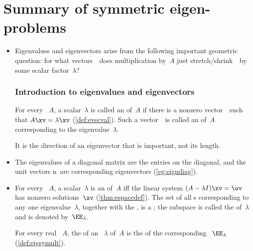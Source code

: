 

\section{Summary of symmetric eigen-problems}
\label{sec:sumevs}


\begin{itemize}
\def\index#1{}%

\item Eigenvalues and eigenvectors arise from the following important geometric question: for what vectors~\vv\ does multiplication by~\(A\) just stretch\slash shrink~\vv\ by some scalar factor~\(\lambda\)?

\subsubsection{Introduction to eigenvalues and eigenvectors}

\itemhi For every ~\(A\),  
a scalar~\(\lambda\) is called an  of~\(A\) if 
there is a nonzero vector~\xv\ such that \(A\xv=\lambda\xv\) (\autoref{def:evecval}). 
Such a vector~\xv\ is called an  of~\(A\) corresponding to the eigenvalue~\(\lambda\).   

It is the direction of an eigenvector that is important, not its length.

\item The eigenvalues of a diagonal matrix are the entries on the diagonal, and the unit vectors \hlist\ev n\ are corresponding eigenvectors (\autoref{eg:eigndiag}). 

\item For every ~\(A\), 
a scalar~\(\lambda\) is an  of~\(A\) iff the  linear system \((A-\lambda I)\xv=\ov\) has nonzero solutions~\(\xv\) (\autoref{thm:espacedef}).  
The set of all s corresponding to any one eigenvalue~\(\lambda\), together with the , is a ; the subspace is called the  of~\(\lambda\) and is denoted by~\(\EE_\lambda\).

\itemme For every real ~\(A\), the  of an ~\(\lambda\) of~\(A\) is the  of the corresponding ~\(\EE_\lambda\) (\autoref{def:eigsymult}).


\end{itemize}

